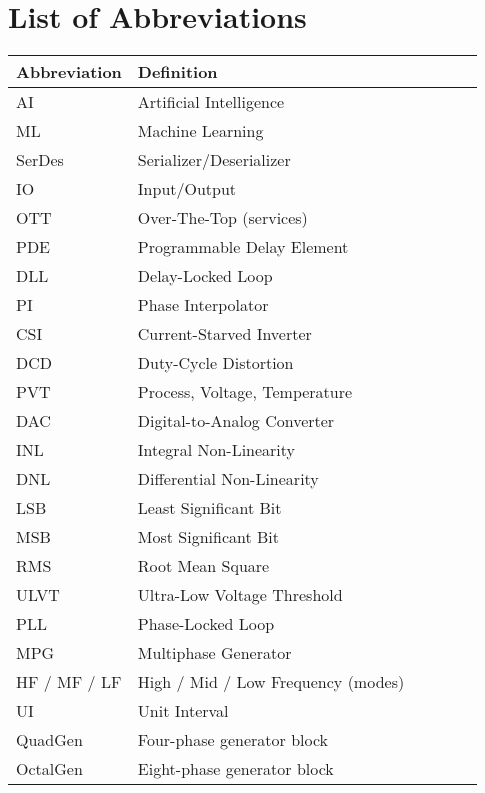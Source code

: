 \section*{List of Abbreviations}
\begin{tabular}{p{0.18\linewidth} p{0.75\linewidth}}
\textbf{Abbreviation} & \textbf{Definition} \\
\hline
AI     & Artificial Intelligence \\
ML     & Machine Learning \\
SerDes & Serializer/Deserializer \\
IO     & Input/Output \\
OTT    & Over-The-Top (services) \\
PDE    & Programmable Delay Element \\
DLL    & Delay-Locked Loop \\
PI     & Phase Interpolator \\
CSI    & Current-Starved Inverter \\
DCD    & Duty-Cycle Distortion \\
PVT    & Process, Voltage, Temperature \\
DAC    & Digital-to-Analog Converter \\
INL    & Integral Non-Linearity \\
DNL    & Differential Non-Linearity \\
LSB    & Least Significant Bit \\
MSB    & Most Significant Bit \\
RMS    & Root Mean Square \\
ULVT   & Ultra-Low Voltage Threshold \\
PLL    & Phase-Locked Loop \\
MPG    & Multiphase Generator \\
HF / MF / LF & High / Mid / Low Frequency (modes) \\
UI     & Unit Interval \\
QuadGen & Four-phase generator block \\
OctalGen & Eight-phase generator block \\
\end{tabular}

